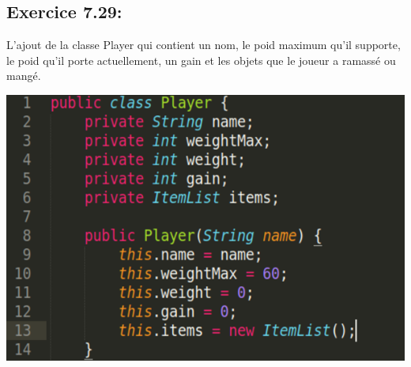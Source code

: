 \documentclass[french,10pt,a4paper]{report}
\begin{document}
\subsection{\textcolor{bb}{Exercice 7.29:}}
L’ajout de la classe Player  qui contient un nom, le poid maximum qu’il supporte, le poid qu’il porte actuellement, un gain et les objets que le joueur a  ramassé ou mangé.
\begin{center}
	\includegraphics[scale=0.4]{captures/it3_2.png}
\end{center}
\end{document}
